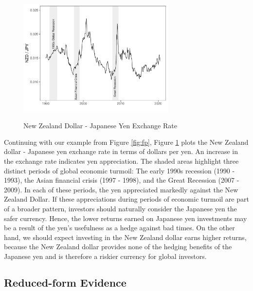 \documentclass{ar-1col}
\begin{document}
\begin{figure}[htp!]
    \centering
    \caption{New Zealand Dollar - Japanese Yen Exchange Rate} 
    \includegraphics[width=0.7\textwidth]{Exhibits/Figure_FX_JPYNZD.pdf}
    \label{fig:spot}
\end{figure}
Continuing with our example from Figure \ref{fig:fp}, Figure \ref{fig:spot} plots the New
Zealand dollar - Japanese yen exchange rate in terms of dollars per
yen. An increase in the exchange rate indicates yen appreciation.
The shaded areas highlight three distinct periods of global economic
turmoil: The early 1990s recession (1990 - 1993), the Asian financial
crisis (1997 - 1998), and the Great Recession (2007 - 2009). In each of these periods, 
the yen appreciated markedly against the New Zealand Dollar. If these appreciations during periods of economic
turmoil are part of a broader pattern, investors should naturally consider the Japanese yen the safer
currency. Hence, the lower returns earned on Japanese yen investments 
may be a result of the yen's usefulness as a hedge against bad times. 
On the other hand, we should expect investing in the New Zealand dollar 
earns higher returns, because the New Zealand dollar provides none of 
the hedging benefits of the Japanese yen and is therefore a riskier 
currency for global investors.

\subsection{Reduced-form Evidence}
\end{document}
